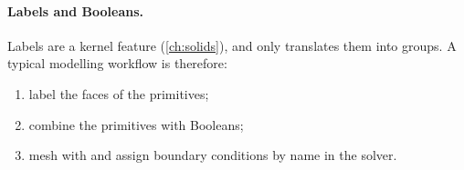 \paragraph{Labels and Booleans.} Labels are a kernel feature (\cref{ch:solids}), and
 only translates them into groups. A typical modelling workflow is
therefore:
\begin{enumerate}
  \item label the faces of the primitives;
  \item combine the primitives with Booleans;
  \item mesh with  and assign boundary conditions by name in the
    solver.
\end{enumerate}
